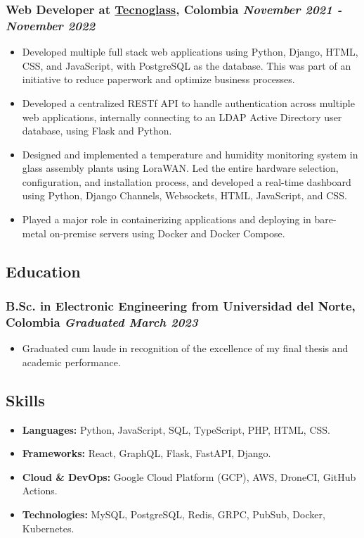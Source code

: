 \documentclass[a4paper,10pt]{article}
\begin{document}
\subsubsection*{%
  \textbf{Web Developer} at \href{https://www.tecnoglass.com/en/}{Tecnoglass}, Colombia
  \hfill
  \textit{November 2021 - November 2022}
}
\begin{itemize}
  \item Developed multiple full stack web applications using Python, Django, HTML, CSS, and JavaScript, with PostgreSQL as the database.
    This was part of an initiative to reduce paperwork and optimize business processes.
    \item Developed a centralized RESTf API to handle authentication across multiple web applications, internally connecting to an
    LDAP Active Directory user database, using Flask and Python.
  \item Designed and implemented a temperature and humidity monitoring system in glass assembly plants using LoraWAN.
    Led the entire hardware selection, configuration, and installation process, and developed a real-time
    dashboard using Python, Django Channels, Websockets, HTML, JavaScript, and CSS.
  \item Played a major role in containerizing applications and deploying in bare-metal on-premise servers using Docker and Docker Compose.
\end{itemize}

\subsection*{Education}
\subsubsection*{\textbf{B.Sc. in Electronic Engineering} from Universidad del Norte, Colombia \hfill \textit{Graduated March 2023}}
\begin{itemize}
  \item Graduated cum laude in recognition of the excellence of my final thesis and academic performance.
\end{itemize}

\subsection*{Skills}
\begin{itemize}
  \item \textbf{Languages:} Python, JavaScript, SQL, TypeScript, PHP, HTML, CSS.
  \item \textbf{Frameworks:} React, GraphQL, Flask, FastAPI, Django.
  \item \textbf{Cloud \& DevOps:} Google Cloud Platform (GCP), AWS, DroneCI, GitHub Actions.
  \item \textbf{Technologies:} MySQL, PostgreSQL, Redis, GRPC, PubSub, Docker, Kubernetes.
\end{itemize}

\end{document}
